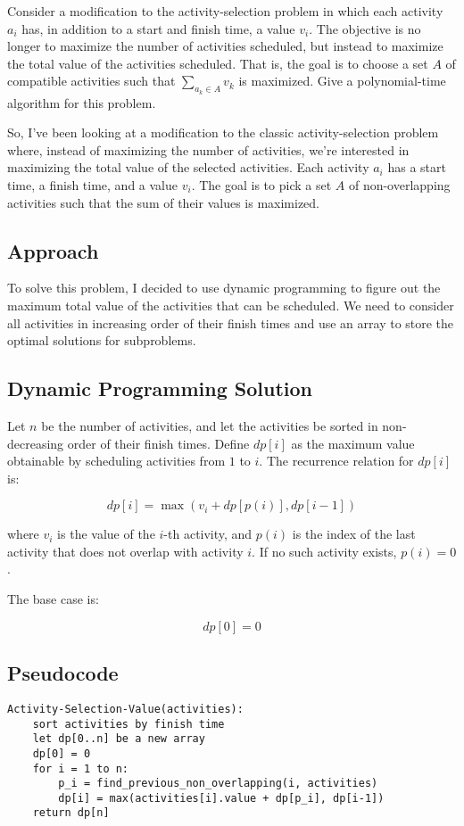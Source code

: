 \documentclass[10pt,letter,notitlepage]{article}
\newcounter{exercise}
\begin{document}
\begin{exercise}[(20 marks)]
Consider a modification to the activity-selection problem in which each activity $a_i$ has, in addition to a start and finish time, a value $v_i$. The objective is no longer to maximize the number of activities scheduled, but instead to maximize the total value of the activities scheduled. That is, the goal is to choose a set $A$ of compatible activities such that $\sum_{a_k \in A} v_k$
is maximized. Give a polynomial-time algorithm for this problem.
\end{exercise}

\begin{Answer}

So, I've been looking at a modification to the classic activity-selection problem where, instead of maximizing the number of activities, we're interested in maximizing the total value of the selected activities. Each activity $a_i$ has a start time, a finish time, and a value $v_i$. The goal is to pick a set $A$ of non-overlapping activities such that the sum of their values is maximized.

\subsection*{Approach}
To solve this problem, I decided to use dynamic programming to figure out the maximum total value of the activities that can be scheduled. We need to consider all activities in increasing order of their finish times and use an array to store the optimal solutions for subproblems.

\subsection*{Dynamic Programming Solution}
Let $n$ be the number of activities, and let the activities be sorted in non-decreasing order of their finish times. Define $dp[i]$ as the maximum value obtainable by scheduling activities from $1$ to $i$. The recurrence relation for $dp[i]$ is:

\[
dp[i] = \max(v_i + dp[p(i)], dp[i-1])
\]

where $v_i$ is the value of the $i$-th activity, and $p(i)$ is the index of the last activity that does not overlap with activity $i$. If no such activity exists, $p(i) = 0$.

The base case is:

\[
dp[0] = 0
\]

\subsection*{Pseudocode}
\begin{verbatim}
Activity-Selection-Value(activities):
    sort activities by finish time
    let dp[0..n] be a new array
    dp[0] = 0
    for i = 1 to n:
        p_i = find_previous_non_overlapping(i, activities)
        dp[i] = max(activities[i].value + dp[p_i], dp[i-1])
    return dp[n]


\end{verbatim}
\end{Answer}
\end{document}
